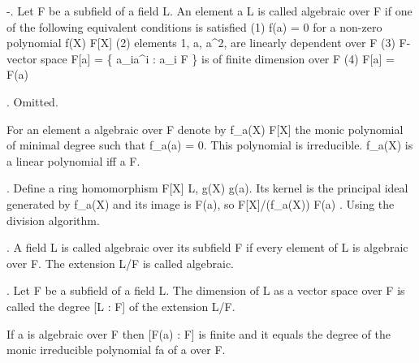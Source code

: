 
-\lemma. Let F be a subfield of a field L. An element a \in L is called 
algebraic over F if one of the following equivalent conditions is satisfied 
  (1) f(a) = 0 for a non-zero polynomial f(X) \in F[X]
  (2) elements 1, a, a^2, \cdots are linearly dependent over F
  (3) F-vector space F[a] = \{ \sum a_ia^i : a_i \in F \} is of finite dimension over F 
  (4) F[a] = F(a)

\proof. Omitted.

  For an element a algebraic over F denote by
                                f_a(X) \in F[X]
the monic polynomial of minimal degree such that f_a(a) = 0. 
  This polynomial is irreducible. f_a(X) is a linear polynomial iff a \in F.

\lemma. Define a ring homomorphism F[X] \rarr L, g(X) \rarr g(a). Its kernel is the
  principal ideal generated by f_a(X) and its image is F(a), so
                              F[X]/(f_a(X)) \cong F(a)
\proof. Using the division algorithm.
                            
. A field L is called algebraic over its subfield F if every element of L is
algebraic over F. The extension L/F is called algebraic. 

. Let F be a subfield of a field L. The dimension of L as a vector space
over F is called the degree [L : F] of the extension L/F.

  If a is algebraic over F then [F(a) : F] is finite and it equals the degree of the
monic irreducible polynomial fa of a over F.


